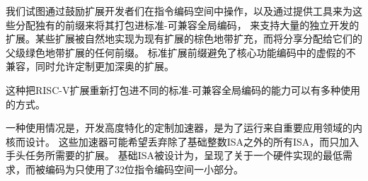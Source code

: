 我们试图通过鼓励扩展开发者们在指令编码空间中操作，以及通过提供工具来为这些分配独有的前缀来将其打包进标准-可兼容全局编码，
来支持大量的独立开发的扩展。某些扩展被自然地实现为现有扩展的棕色地带扩充，而将分享分配给它们的父级绿色地带扩展的任何前缀。
标准扩展前缀避免了核心功能编码中的虚假的不兼容，同时允许定制更加深奥的扩展。

这种把RISC-V扩展重新打包进不同的标准-可兼容全局编码的能力可以有多种使用的方式。

一种使用情况是，开发高度特化的定制加速器，是为了运行来自重要应用领域的内核而设计。
这些加速器可能希望丢弃除了基础整数ISA之外的所有ISA，而只加入手头任务所需要的扩展。
基础ISA被设计为，呈现了关于一个硬件实现的最低需求，而被编码为只使用了32位指令编码空间一小部分。


